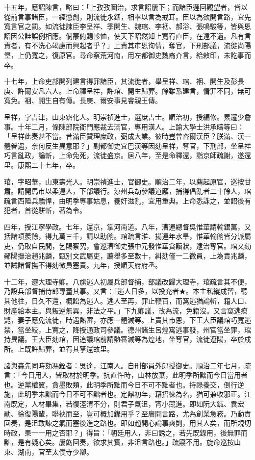 \begin{pinyinscope}
十五年，應詔陳言，略曰：「上孜孜圖治，求言詔屢下；而諸臣遲回觀望者，皆以從前言事諸臣，一經懲創，則流徙永錮，相率以言為戒耳。臣以為欲開言路，宜先寬言官之罰。如流徙諫臣李呈祥、季開生、魏琯、李裀、郝浴、張鳴駿等，皆與恩詔因公詿誤例相應。倘蒙俯賜軫恤，使天下昭然知上寬宥直臣，在遠不遺。凡有言責者，有不洗心竭慮而興起者乎？」上責其市恩徇情，奪官，下刑部議，流徙尚陽堡，上仍寬之，復原官。尋命察荒河南，用左都御史魏裔介言，給敕印，未訖事而卒。

十七年，上命吏部開列建言得罪諸臣，其流徙者，舉呈祥、琯、裀、開生及彭長庚、許爾安凡六人。上命釋呈祥，許琯、開生歸葬。餘雖系建言，情罪不同，無可寬免。裀、開生自有傳。長庚、爾安事見睿親王傳。

呈祥，字吉津，山東霑化人。明崇禎進士，選庶吉士。順治初，授編修。累遷少詹事。十年二月，條陳部院衙門應裁去滿官，專用漢人。上諭大學士洪承疇等曰：「呈祥此奏甚不當。昔滿臣贊理庶政，弼成大業。彼時豈曾咨爾漢臣？朕滿、漢一體眷遇，奈何反生異意耶？」副都御史宜巴漢等因劾呈祥，奪官，下刑部，坐呈祥巧言亂政，論斬，上命免死，流徙盛京。居八年，至是命釋還，詣京師疏謝，遂還里。康熙二十七年，卒。

琯，字昭華，山東壽光人。明崇禎進士，官御史。順治二年，以薦起原官，巡按甘肅。請開馬市以柔遠人，下部議行。涼州兵劫參議道廨，捕得倡亂者二十餘人，琯疏言西陲兵驕悍，由明季專事姑息，養奸滋亂，宜用重典。上命悉誅之，並詔後有犯者，首從駢斬，著為令。

四年，授江寧學政。七年，還京，掌河南道。八年，漕運總督吳惟華請輸銀萬，又括諸項羨餘，得九萬三千，請以助餉。琯疏言淮、揚連年水旱，惟華輸餉皆分派屬吏，仍取自民間，乞賜察究，會巡漕御史張中元發惟華貪黷狀，逮治奪官。琯又劾鄖陽撫治趙兆麟，甄別文武屬吏，薦舉多至數十，糾劾僅一二微員，上為責兆麟，並誡諸督撫不得劾微員塞責。九年，授順天府府丞。

十二年，遷大理寺卿。八旗逃人初屬兵部督捕，部議改歸大理寺，琯疏言其不便，乃設兵部督捕侍郎專董其事。又言：「逃人日多，以投充者★。本主私縱成習，聽其他往，日久不還，概訟為逃人。逃人至再，罪止鞭百，而窩逃猶論斬，籍人口、財產給本主。與叛逆無異，非法之平。」下九卿議，改為流，免籍沒。又言窩逃瘐斃，妻子應免流徙，時遇熱審，亦應一體減等。上責其市恩，下王大臣議琯巧寬逃禁，當坐絞，上寬之，降授通政司參議。德州諸生呂煌窩逃事發，州官當坐罪，琯持異議。王大臣劾琯，因追議琯前請熱審減等為煌地，坐奪官，流徙遼陽，卒於戍所。上既許歸葬，並宥其孥還故里。

諸與森先同時劾馮銓者：吳達，江南人。自刑部員外郎授御史。順治二年七月，疏言：「今日用人，皆取材於明季。抗直忤時，山林放棄，此明季所黜而今日當用者也。逆黨權翼，貪墨敗類，此明季所黜而今日不可不黜者也。持祿養交，倒行逆施，此明季未黜而今日不可不黜者也。定鼎初年，藉招徠為名，猶可兼收邪正。江南既定，人材畢集，若復涇渭不分，則君子氣沮，宵小競進。即如阮大鋮、袁宏勛、徐復陽輩，聯袂而至，豈可概加錄用乎？至廣開言路，尤為創業急務。乃動責回奏，是沮敢諫之氣而塞後進之路也。即如趙開心論事爽剴，用其人矣，而所規切時政，果一一用之否耶？」得旨：「朝廷用人，非曰誘之，若先既錄用，後無罪而黜，是有疑心矣。屢飭回奏，欲求其實，非沮言路也。」疏寢不用。旋命巡按山東、湖南，官至太僕寺少卿。


\end{pinyinscope}
